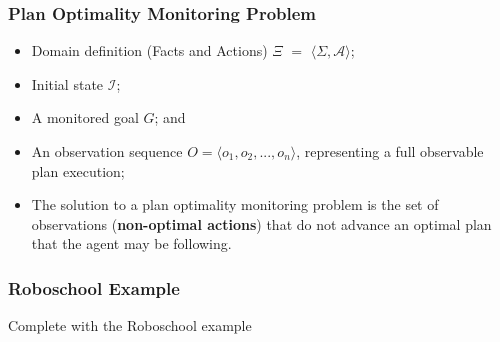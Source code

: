 \documentclass{beamer}
\newcommand{\todo}[1]{ {\color{red} #1} }
\begin{document}
\begin{frame}[c]\frametitle{Plan Optimality Monitoring Problem}
	\begin{definition}
		\begin{itemize}
   			\item Domain definition (Facts and Actions) $\Xi$ $=$ $\langle \Sigma, \mathcal{A} \rangle$;
   			\item Initial state \textbf{$\mathcal{I}$};
   			\item A monitored goal $G$; and
   			\item An observation sequence $O = \langle o_1, o_2, ..., o_n \rangle$, representing a full observable plan execution;
   		\end{itemize}			
	\end{definition}
	\begin{itemize}
		\item The solution to a plan optimality monitoring problem is the set of observations (\textbf{non-optimal actions}) that do not advance an optimal plan that the agent may be following.
	\end{itemize}
\end{frame}

\begin{frame}[c]\frametitle{Roboschool Example}
	\todo{Complete with the Roboschool example}
\end{frame}
\end{document}
